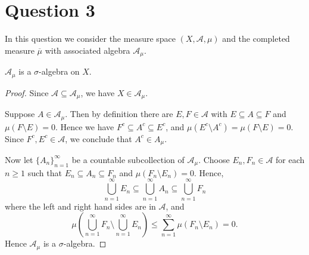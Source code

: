 \documentclass{unswmaths}
\begin{document}
\section*{Question 3}
In this question we consider the measure space $(X,\mathcal{A},\mu)$
and the completed measure $\overline{\mu}$ with associated
algebra $\mathcal{A}_\mu$.
\begin{lemma}
    $\mathcal{A}_\mu$ is a $\sigma$-algebra on $X$.    
\end{lemma}
\begin{proof}
    Since $\mathcal{A} \subseteq \mathcal{A}_\mu$, we have $X \in \mathcal{A}_\mu$.
    
    Suppose $A \in \mathcal{A}_\mu$. Then by definition there are $E,F \in \mathcal{A}$
    with $E \subseteq A \subseteq F$ and $\mu(F \setminus E) = 0$. Hence we 
    have $F^c \subseteq A^c \subseteq E^c$, and $\mu(E^c \setminus A^c) = \mu(F\setminus E) = 0$.
    Since $F^c, E^c \in \mathcal{A}$, we conclude that $A^c \in A_\mu$.
    
    Now let $\{A_n\}_{n=1}^\infty$ be a countable subcollection of $\mathcal{A}_\mu$. 
    Choose $E_n, F_n \in \mathcal{A}$ for each $n\geq 1$ such that $E_n \subseteq A_n \subseteq F_n$
    and $\mu(F_n\setminus E_n) = 0$.
    Hence,
    \begin{equation*}
        \bigcup_{n=1}^\infty E_n \subseteq \bigcup_{n=1}^\infty A_n \subseteq \bigcup_{n=1}^\infty F_n
    \end{equation*}
    where the left and right hand sides are in $\mathcal{A}$, and
    \begin{equation*}
        \mu(\bigcup_{n=1}^\infty F_n \setminus \bigcup_{n=1}^\infty E_n) \leq \sum_{n=1}^\infty \mu(F_n\setminus E_n) = 0.
    \end{equation*}
    Hence $\mathcal{A}_\mu$ is a $\sigma$-algebra.    
\end{proof}
\end{document}
